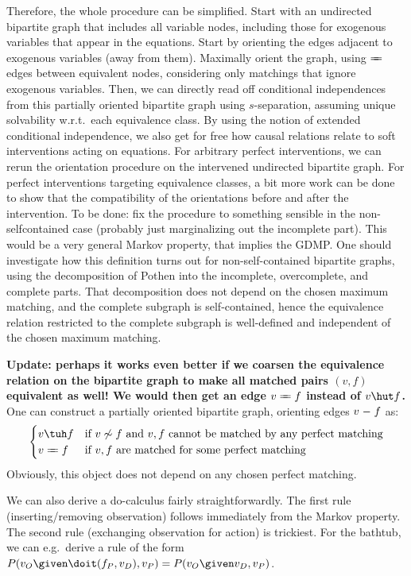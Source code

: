 \begin{Def}
  Therefore, the whole procedure can be simplified. Start with an undirected bipartite
  graph that includes all variable nodes, including those for exogenous variables that
  appear in the equations. Start by orienting the edges adjacent to exogenous variables 
  (away from them). Maximally orient the graph, using $\otto$ edges between equivalent nodes, 
  considering only matchings that ignore exogenous variables. Then, we can directly read off
  conditional independences from this partially oriented bipartite graph using $s$-separation,
  assuming unique solvability w.r.t.\ each equivalence class. 
  By using the notion of extended conditional independence, we also get for free how
  causal relations relate to soft interventions acting on equations. For arbitrary 
  perfect interventions, we can rerun the orientation procedure on the intervened undirected
  bipartite graph. For perfect interventions targeting equivalence classes, a bit more work 
  can be done to show that the compatibility of the orientations before and after the intervention.
  To be done: fix the procedure to something sensible in the non-selfcontained case
  (probably just marginalizing out the incomplete part).
  This would be a very general Markov property, that implies the GDMP.
  One should investigate how this definition turns out for non-self-contained bipartite graphs, using the decomposition of Pothen into the incomplete, overcomplete, and complete parts.
  That decomposition does not depend on the chosen maximum matching, and the complete subgraph is self-contained, hence the equivalence relation restricted to the complete subgraph is well-defined and independent of the chosen maximum matching.
\end{Def}

\textbf{Update: perhaps it works even better if we coarsen the equivalence relation on the bipartite graph to make all matched pairs $(v,f)$ equivalent as well! We would then get an edge $v \otto f$ instead of $v \hut f$.}
One can construct a partially oriented bipartite graph, orienting edges $v \relbar f$ as:
$$\begin{cases}
    v \tuh f & \text{if $v \not\sim f$ and $v,f$ cannot be matched by any perfect matching} \\
    v \otto f & \text{if $v,f$ are matched for some perfect matching}
\end{cases}$$
Obviously, this object does not depend on any chosen perfect matching.

We can also derive a do-calculus fairly straightforwardly.
The first rule (inserting/removing observation) follows immediately from the Markov property.
The second rule (exchanging observation for action) is trickiest. 
For the bathtub, we can e.g.\ derive a rule of the form $P(v_O \given \doit(f_P,v_D), v_P) = P(v_O \given v_D, v_P)$.

